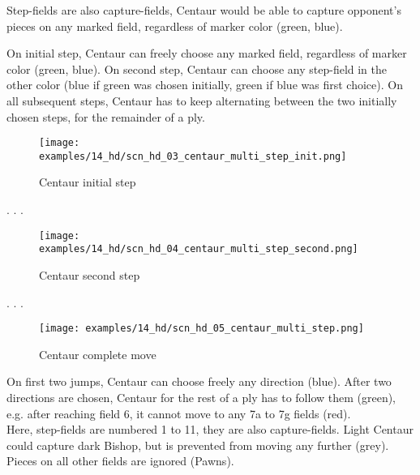 Step-fields are also capture-fields, Centaur would be able to capture opponent's pieces on any
marked field, regardless of marker color (green, blue).

On initial step, Centaur can freely choose any marked field, regardless of marker color (green,
blue). On second step, Centaur can choose any step-field in the other color (blue if green was
chosen initially, green if blue was first choice). On all subsequent steps, Centaur has to keep
alternating between the two initially chosen steps, for the remainder of a ply.

\clearpage %

\noindent
\begin{figure}[!h]
\texttt{[image: examples/14\_hd/scn\_hd\_03\_centaur\_multi\_step\_init.png]}
\caption{Centaur initial step}
\label{fig:scn_hd_03_centaur_multi_step_init}
\end{figure}

. . .

\clearpage %

\noindent
\begin{figure}[!h]
\texttt{[image: examples/14\_hd/scn\_hd\_04\_centaur\_multi\_step\_second.png]}
\caption{Centaur second step}
\label{fig:scn_hd_04_centaur_multi_step_second}
\end{figure}

. . .

\clearpage %

\noindent
\begin{figure}[!h]
\texttt{[image: examples/14\_hd/scn\_hd\_05\_centaur\_multi\_step.png]}
\caption{Centaur complete move}
\label{fig:scn_hd_05_centaur_multi_step}
\end{figure}

On first two jumps, Centaur can choose freely any direction (blue). After
two directions are chosen, Centaur for the rest of a ply has to follow
them (green), e.g. after reaching field 6, it cannot move to any 7a to 7g
fields (red). \\
Here, step-fields are numbered 1 to 11, they are also capture-fields. Light
Centaur could capture dark Bishop, but is prevented from moving any further
(grey). Pieces on all other fields are ignored (Pawns).

